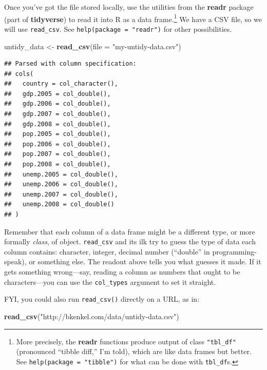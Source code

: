 \documentclass[
  12pt,
  oneside,openany]{book}
\newenvironment{Shaded}{\begin{snugshade}}{\end{snugshade}}
\newcommand{\DataTypeTok}[1]{\textcolor[rgb]{0.13,0.29,0.53}{#1}}
\newcommand{\KeywordTok}[1]{\textcolor[rgb]{0.13,0.29,0.53}{\textbf{#1}}}
\newcommand{\NormalTok}[1]{#1}
\newcommand{\StringTok}[1]{\textcolor[rgb]{0.31,0.60,0.02}{#1}}
\begin{document}
Once you've got the file stored locally, use the utilities from the \textbf{readr} package (part of \textbf{tidyverse}) to read it into R as a data frame.\footnote{More precisely, the \textbf{readr} functions produce output of class \texttt{"tbl\_df"} (pronounced ``tibble diff,'' I'm told), which are like data frames but better. See \texttt{help(package\ =\ "tibble")} for what can be done with \texttt{tbl\_df}s.} We have a CSV file, so we will use \texttt{read\_csv}. See \texttt{help(package\ =\ "readr")} for other possibilities.

\begin{Shaded}
\begin{Highlighting}[]
\NormalTok{untidy\_data <{-}}\StringTok{ }\KeywordTok{read\_csv}\NormalTok{(}\DataTypeTok{file =} \StringTok{"my{-}untidy{-}data.csv"}\NormalTok{)}
\end{Highlighting}
\end{Shaded}

\begin{verbatim}
## Parsed with column specification:
## cols(
##   country = col_character(),
##   gdp.2005 = col_double(),
##   gdp.2006 = col_double(),
##   gdp.2007 = col_double(),
##   gdp.2008 = col_double(),
##   pop.2005 = col_double(),
##   pop.2006 = col_double(),
##   pop.2007 = col_double(),
##   pop.2008 = col_double(),
##   unemp.2005 = col_double(),
##   unemp.2006 = col_double(),
##   unemp.2007 = col_double(),
##   unemp.2008 = col_double()
## )
\end{verbatim}

Remember that each column of a data frame might be a different type, or more formally \emph{class}, of object. \texttt{read\_csv} and its ilk try to guess the type of data each column contains: character, integer, decimal number (``double'' in programming-speak), or something else. The readout above tells you what guesses it made. If it gets something wrong---say, reading a column as numbers that ought to be characters---you can use the \texttt{col\_types} argument to set it straight.

FYI, you could also run \texttt{read\_csv()} directly on a URL, as in:

\begin{Shaded}
\begin{Highlighting}[]
\KeywordTok{read\_csv}\NormalTok{(}\StringTok{"http://bkenkel.com/data/untidy{-}data.csv"}\NormalTok{)}
\end{Highlighting}
\end{Shaded}
\end{document}
